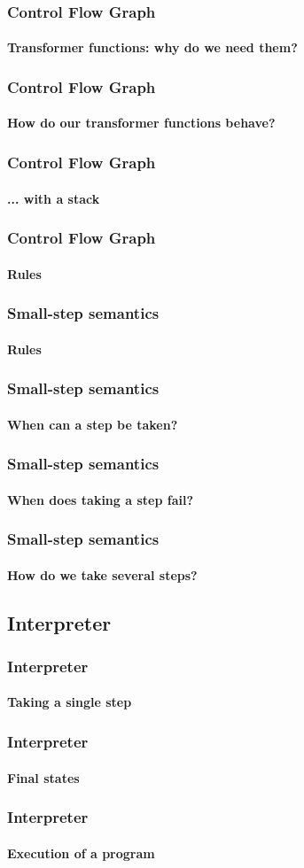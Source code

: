 \begin{frame}
\frametitle{Control Flow Graph}
\framesubtitle{Transformer functions: why do we need them?}


\end{frame}


\begin{frame}
\frametitle{Control Flow Graph}
\framesubtitle{How do our transformer functions behave?}


\end{frame}


\begin{frame}
\frametitle{Control Flow Graph}
\framesubtitle{... with a stack}


\end{frame}


\begin{frame}
\frametitle{Control Flow Graph}
\framesubtitle{Rules}


\end{frame}


\begin{frame}
\frametitle{Small-step semantics}
\framesubtitle{Rules}


\end{frame}


\begin{frame}
\frametitle{Small-step semantics}
\framesubtitle{When can a step be taken?}


\end{frame}


\begin{frame}
\frametitle{Small-step semantics}
\framesubtitle{When does taking a step fail?}


\end{frame}


\begin{frame}
\frametitle{Small-step semantics}
\framesubtitle{How do we take several steps?}


\end{frame}


\subsection{Interpreter}

\begin{frame}
\frametitle{Interpreter}
\framesubtitle{Taking a single step}


\end{frame}


\begin{frame}
\frametitle{Interpreter}
\framesubtitle{Final states}


\end{frame}


\begin{frame}
\frametitle{Interpreter}
\framesubtitle{Execution of a program}


\end{frame}
